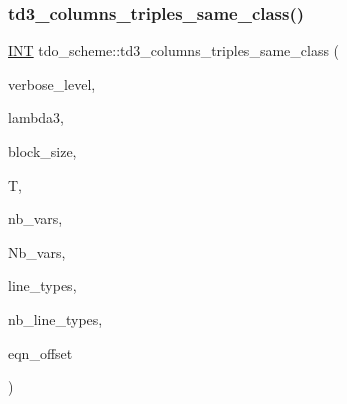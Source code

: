 \subsubsection{\texorpdfstring{td3\+\_\+columns\+\_\+triples\+\_\+same\+\_\+class()}{td3\_columns\_triples\_same\_class()}}
{\footnotesize\ttfamily \mbox{\hyperlink{galois_8h_a09fddde158a3a20bd2dcadb609de11dc}{I\+NT}} tdo\+\_\+scheme\+::td3\+\_\+columns\+\_\+triples\+\_\+same\+\_\+class (\begin{DoxyParamCaption}\item[{\mbox{\hyperlink{galois_8h_a09fddde158a3a20bd2dcadb609de11dc}{I\+NT}}}]{verbose\+\_\+level,  }\item[{\mbox{\hyperlink{galois_8h_a09fddde158a3a20bd2dcadb609de11dc}{I\+NT}}}]{lambda3,  }\item[{\mbox{\hyperlink{galois_8h_a09fddde158a3a20bd2dcadb609de11dc}{I\+NT}}}]{block\+\_\+size,  }\item[{\mbox{\hyperlink{classtdo__data}{tdo\+\_\+data}} \&}]{T,  }\item[{\mbox{\hyperlink{galois_8h_a09fddde158a3a20bd2dcadb609de11dc}{I\+NT}}}]{nb\+\_\+vars,  }\item[{\mbox{\hyperlink{galois_8h_a09fddde158a3a20bd2dcadb609de11dc}{I\+NT}}}]{Nb\+\_\+vars,  }\item[{\mbox{\hyperlink{galois_8h_a09fddde158a3a20bd2dcadb609de11dc}{I\+NT}} $\ast$\&}]{line\+\_\+types,  }\item[{\mbox{\hyperlink{galois_8h_a09fddde158a3a20bd2dcadb609de11dc}{I\+NT}} \&}]{nb\+\_\+line\+\_\+types,  }\item[{\mbox{\hyperlink{galois_8h_a09fddde158a3a20bd2dcadb609de11dc}{I\+NT}}}]{eqn\+\_\+offset }\end{DoxyParamCaption})}

\mbox{\label{classtdo__scheme_a97cc9ab401a79f972dbfb34a4c371d30}} 
